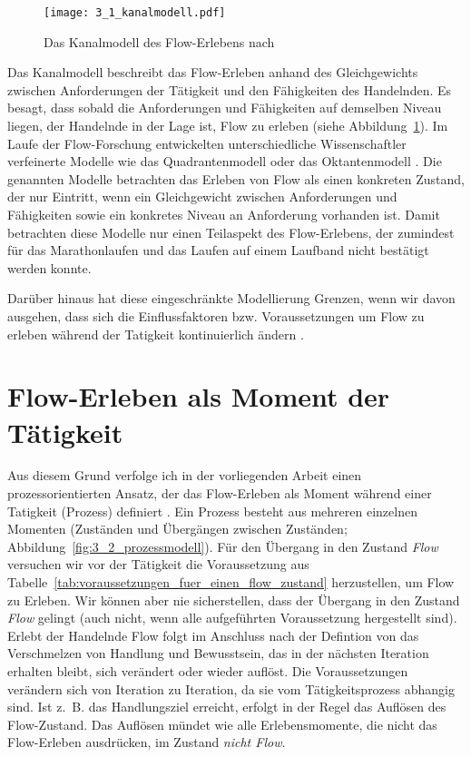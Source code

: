 \begin{figure}[t]
	\centering
		\texttt{[image: 3\_1\_kanalmodell.pdf]}
	\caption[Das Kanalmodell des Flow-Erlebens]{Das Kanalmodell des Flow-Erlebens nach \citet[S.~75]{Csikszentmihalyi2010}}
	\label{fig:3_1_kanalmodell}
\end{figure}

Das Kanalmodell beschreibt das Flow-Erleben anhand des Gleichgewichts zwischen Anforderungen der Tätigkeit und den Fähigkeiten des Handelnden. Es besagt, dass sobald die Anforderungen und Fähigkeiten auf demselben Niveau liegen, der Handelnde in der Lage ist, Flow zu erleben (siehe Abbildung~\ref{fig:3_1_kanalmodell}). Im Laufe der Flow-Forschung entwickelten unterschiedliche Wissenschaftler verfeinerte Modelle wie das Quadrantenmodell \citep[S.~286]{Csikszentmihalyi1995} oder das Oktantenmodell \citep[S.~296]{Massimini1995}. Die genannten Modelle betrachten das Erleben von Flow als einen konkreten Zustand, der nur Eintritt, wenn ein Gleichgewicht zwischen Anforderungen und Fähigkeiten sowie ein konkretes Niveau an Anforderung vorhanden ist. Damit betrachten diese Modelle nur einen Teilaspekt des Flow-Erlebens, der zumindest für das Marathonlaufen \citep{Stoll2005} und das Laufen auf einem Laufband \citep{Reinhardt2006} nicht bestätigt werden konnte. 

Darüber hinaus hat diese eingeschränkte Modellierung Grenzen, wenn wir davon ausgehen, dass sich die Einflussfaktoren bzw. Voraussetzungen um Flow zu erleben während der Tatigkeit kontinuierlich ändern \citep[][]{Grueter2016b}.


\section{Flow-Erleben als Moment der Tätigkeit} %
\label{sec:flow_erleben_als_moment_der_tatigkeit}

Aus diesem Grund verfolge ich in der vorliegenden Arbeit einen prozessorientierten Ansatz, der das Flow-Erleben als Moment während einer Tatigkeit (Prozess) definiert \citep[][S.~2]{Grueter2006}. Ein Prozess besteht aus mehreren einzelnen Momenten (Zuständen und Übergängen zwischen Zuständen; Abbildung~\ref{fig:3_2_prozessmodell}). Für den Übergang in den Zustand \emph{Flow} versuchen wir vor der Tätigkeit die Voraussetzung aus Tabelle~\ref{tab:voraussetzungen_fuer_einen_flow_zustand} herzustellen, um Flow zu Erleben. Wir können aber nie sicherstellen, dass der Übergang in den Zustand \emph{Flow} gelingt (auch nicht, wenn alle aufgeführten Voraussetzung hergestellt sind). Erlebt der Handelnde Flow folgt im Anschluss nach der Defintion von \citet{Henk2014} das Verschmelzen von Handlung und Bewusstsein, das in der nächsten Iteration erhalten bleibt, sich verändert oder wieder auflöst. Die Voraussetzungen verändern sich von Iteration zu Iteration, da sie vom Tätigkeitsprozess abhangig sind. Ist z.~B. das Handlungsziel erreicht, erfolgt in der Regel das Auflösen des Flow-Zustand. Das Auflösen mündet wie alle Erlebensmomente, die nicht das Flow-Erleben ausdrücken, im Zustand \emph{nicht Flow}. 

